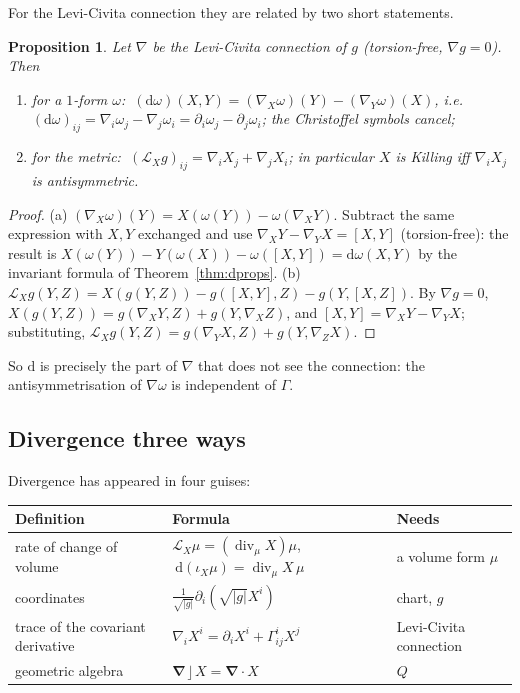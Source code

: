 \documentclass[11pt,a4paper]{article}
\newcounter{thm}[section]
\numberwithin{equation}{section}
\theoremstyle{definition}
\theoremstyle{plain}
\newtheorem{proposition}[thm]{Proposition}
\newcommand{\dd}{\mathrm{d}}
\newcommand{\Lie}{\mathcal{L}}
\newcommand{\lc}{\mathbin{\rfloor}}
\newcommand{\vd}{\boldsymbol{\nabla}}               %
\begin{document}
For the Levi-Civita connection they are related by two short statements.

\begin{proposition}\label{prop:threederivs}
Let $\nabla$ be the Levi-Civita connection of $g$ (torsion-free, $\nabla g=0$). Then
\begin{enumerate}[label=(\alph*)]
\item for a $1$-form $\omega$: $\ (\dd\omega)(X,Y)=(\nabla_X\omega)(Y)-(\nabla_Y\omega)(X)$, i.e.\ $(\dd\omega)_{ij}=\nabla_i\omega_j-\nabla_j\omega_i=\partial_i\omega_j-\partial_j\omega_i$; the Christoffel symbols cancel;
\item for the metric: $\ (\Lie_Xg)_{ij}=\nabla_iX_j+\nabla_jX_i$; in particular $X$ is Killing iff $\nabla_iX_j$ is antisymmetric.
\end{enumerate}
\end{proposition}
\begin{proof}
(a) $(\nabla_X\omega)(Y)=X(\omega(Y))-\omega(\nabla_XY)$. Subtract the same expression with $X,Y$ exchanged and use $\nabla_XY-\nabla_YX=[X,Y]$ (torsion-free): the result is $X(\omega(Y))-Y(\omega(X))-\omega([X,Y])=\dd\omega(X,Y)$ by the invariant formula of Theorem~\ref{thm:dprops}.
(b) $\Lie_Xg(Y,Z)=X(g(Y,Z))-g([X,Y],Z)-g(Y,[X,Z])$. By $\nabla g=0$, $X(g(Y,Z))=g(\nabla_XY,Z)+g(Y,\nabla_XZ)$, and $[X,Y]=\nabla_XY-\nabla_YX$; substituting, $\Lie_Xg(Y,Z)=g(\nabla_YX,Z)+g(Y,\nabla_ZX)$.
\end{proof}

So $\dd$ is precisely the part of $\nabla$ that does not see the connection: the antisymmetrisation of $\nabla\omega$ is independent of $\Gamma$.

\subsection{Divergence three ways}\label{sec:divthree}

Divergence has appeared in four guises:
\begin{center}
\small
\begin{tabular}{@{}p{4.1cm}p{5.4cm}p{4.6cm}@{}}
\toprule
\textbf{Definition} & \textbf{Formula} & \textbf{Needs}\\
\midrule
rate of change of volume & $\Lie_X\mu=(\operatorname{div}_\mu X)\mu$, $\ \dd(\iota_X\mu)=\operatorname{div}_\mu X\,\mu$ & a volume form $\mu$\\
coordinates & $\frac1{\sqrt{|g|}}\partial_i(\sqrt{|g|}X^i)$ & chart, $g$\\
trace of the covariant derivative & $\nabla_iX^i=\partial_iX^i+\Gamma^i_{ij}X^j$ & Levi-Civita connection\\
geometric algebra & $\vd\lc X=\vd\cdot X$ & $Q$\\
\bottomrule
\end{tabular}
\end{center}
\end{document}
